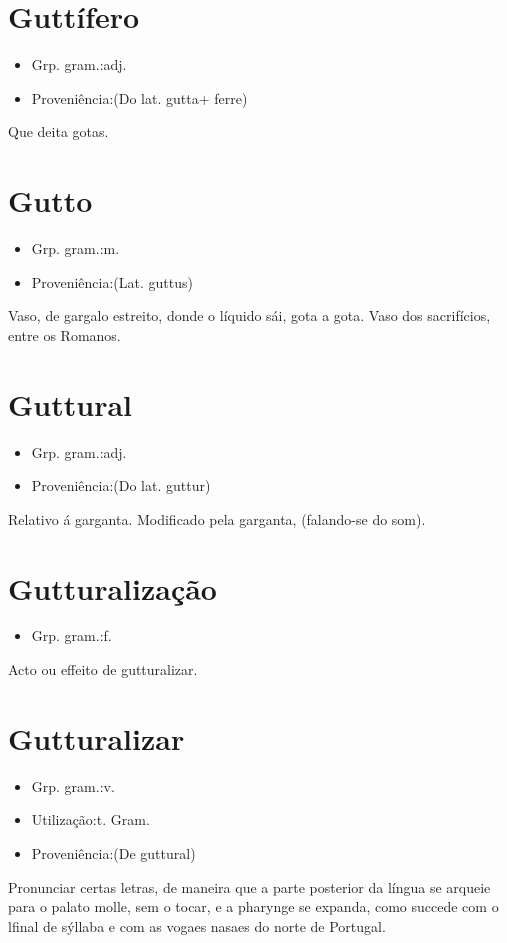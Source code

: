 \section{Guttífero}
\begin{itemize}
\item {Grp. gram.:adj.}
\end{itemize}
\begin{itemize}
\item {Proveniência:(Do lat. \textunderscore gutta\textunderscore  + \textunderscore ferre\textunderscore )}
\end{itemize}
Que deita gotas.
\section{Gutto}
\begin{itemize}
\item {Grp. gram.:m.}
\end{itemize}
\begin{itemize}
\item {Proveniência:(Lat. \textunderscore guttus\textunderscore )}
\end{itemize}
Vaso, de gargalo estreito, donde o líquido sái, gota a gota.
Vaso dos sacrifícios, entre os Romanos.
\section{Guttural}
\begin{itemize}
\item {Grp. gram.:adj.}
\end{itemize}
\begin{itemize}
\item {Proveniência:(Do lat. \textunderscore guttur\textunderscore )}
\end{itemize}
Relativo á garganta.
Modificado pela garganta, (falando-se do som).
\section{Gutturalização}
\begin{itemize}
\item {Grp. gram.:f.}
\end{itemize}
Acto ou effeito de gutturalizar.
\section{Gutturalizar}
\begin{itemize}
\item {Grp. gram.:v.}
\end{itemize}
\begin{itemize}
\item {Utilização:t. Gram.}
\end{itemize}
\begin{itemize}
\item {Proveniência:(De \textunderscore guttural\textunderscore )}
\end{itemize}
Pronunciar certas letras, de maneira que a parte posterior da língua se arqueie para o palato molle, sem o tocar, e a pharynge se expanda, como succede com o \textunderscore l\textunderscore  final de sýllaba e com as vogaes nasaes do norte de Portugal.
